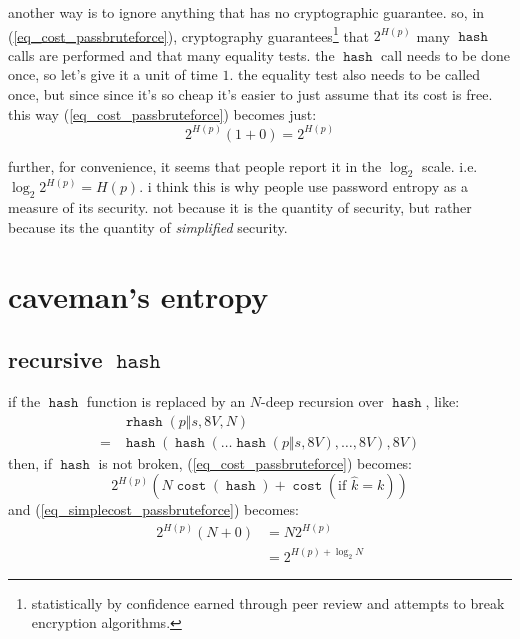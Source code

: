 \documentclass[twocolumn]{article}
\DeclareMathOperator{\hash}{\mathtt{hash}}
\DeclareMathOperator{\rhash}{\mathtt{rhash}}
\DeclareMathOperator{\cost}{\mathtt{cost}}
\begin{document}
another way is to ignore anything that has no cryptographic guarantee.  so,
in (\ref{eq_cost_passbruteforce}), cryptography
guarantees\footnote{statistically by confidence earned through peer review
and attempts to break encryption algorithms.} that $2^{H(p)}$ many $\hash$
calls are performed and that many equality tests.  the $\hash$ call needs
to be done once, so let's give it a unit of time $1$.  the equality test
also needs to be called once, but since since it's so cheap it's easier to
just assume that its cost is free.  this way (\ref{eq_cost_passbruteforce})
becomes just:
\begin{equation}\label{eq_simplecost_passbruteforce}
    2^{H(p)} (1+0) = 2^{H(p)}
\end{equation}

further, for convenience, it seems that people report it in the $\log_2$
scale.  i.e. $\log_2 2^{H(p)} = H(p)$.  i think this is why people use
password entropy as a measure of its security.  not because it is the
quantity of security, but rather because its the quantity of
\emph{simplified} security.  

\section{caveman's entropy}
\subsection{recursive $\hash$}
if the $\hash$ function is replaced by an $N$-deep recursion over $\hash$,
like:
\[
    \begin{split}
        & \rhash(p \Vert s, 8V, N) \\
    ={} &  \hash(\hash(\ldots\hash(p \Vert s, 8V), \ldots, 8V), 8V)
    \end{split}
\]
then, if $\hash$ is not broken,  (\ref{eq_cost_passbruteforce}) becomes:
\begin{equation}\label{eq_cost_passbruteforce_N}
    2^{H(p)} \left(
        N\cost(\hash) + \cost(\text{if } \hat k = k)
    \right)
\end{equation}
and (\ref{eq_simplecost_passbruteforce}) becomes:
\begin{equation}\label{eq_simplecost_passbruteforce_N}
    \begin{split}
    2^{H(p)} (N+0) &= N2^{H(p)} \\
                  &= 2^{H(p) + \log_2 N}
    \end{split}
\end{equation}
\end{document}
